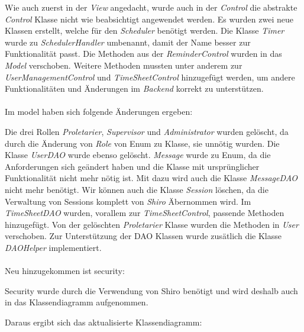Wie auch zuerst in der \emph{View} angedacht, wurde auch in der \emph{Control} die abstrakte \emph{Control} Klasse 
nicht wie beabsichtigt angewendet werden.
Es wurden zwei neue Klassen erstellt, welche für den \emph{Scheduler} benötigt werden. 
Die Klasse \emph{Timer} wurde zu \emph{SchedulerHandler} umbenannt, damit der Name besser zur Funktionalität passt.
Die Methoden aus der \emph{ReminderControl} wurden in das \emph{Model} verschoben.
Weitere Methoden mussten unter anderem zur \emph{UserManagementControl} und \emph{TimeSheetControl} hinzugefügt werden, 
um andere Funktionalitäten und Änderungen im \emph{Backend} korrekt zu unterstützen.\\
\\
Im model haben sich folgende Änderungen ergeben: %

Die drei Rollen \emph{Proletarier}, \emph{Supervisor} und \emph{Administrator} wurden gelöscht, da durch 
die Änderung von \emph{Role} von Enum zu Klasse, sie unnötig wurden. Die Klasse \emph{UserDAO} wurde ebenso gelöscht.
\emph{Message} wurde zu Enum, da die Anforderungen sich geändert haben und 
die Klasse mit ursprünglicher Funktionalität nicht mehr nötig ist. Mit dazu wird auch die Klasse \emph{MessageDAO} nicht mehr benötigt.
Wir können auch die Klasse \emph{Session} löschen, da die Verwaltung von Sessions komplett von \emph{Shiro} Äbernommen wird.
Im \emph{TimeSheetDAO} wurden, vorallem zur \emph{TimeSheetControl}, passende Methoden hinzugefügt.
Von der gelöschten \emph{Proletarier} Klasse wurden die Methoden in \emph{User} verschoben.
Zur Unterstützung der DAO Klassen wurde zusätlich die Klasse \emph{DAOHelper} implementiert.\\
\\
Neu hinzugekommen ist security:

Security wurde durch die Verwendung von Shiro benötigt und wird deshalb auch in das Klassendiagramm aufgenommen.
\newpage

Daraus ergibt sich das aktualisierte Klassendiagramm:

